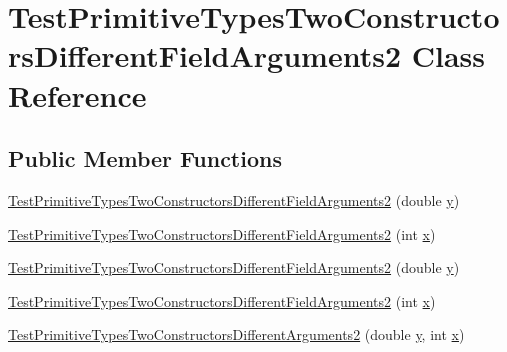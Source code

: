 \hypertarget{classTestPrimitiveTypesTwoConstructorsDifferentFieldArguments2}{
\section{TestPrimitiveTypesTwoConstructorsDifferentFieldArguments2 Class Reference}
\label{classTestPrimitiveTypesTwoConstructorsDifferentFieldArguments2}
}
\subsection*{Public Member Functions}
\begin{DoxyCompactItemize}
\item 
\hyperlink{classTestPrimitiveTypesTwoConstructorsDifferentFieldArguments2_a0d692176317889c0bd07408db128cf9e}{TestPrimitiveTypesTwoConstructorsDifferentFieldArguments2} (double \hyperlink{classTestPrimitiveTypesTwoConstructorsDifferentFieldArguments2_a1022b1a98ab1e4b04e7a1647d4f4f542}{y})
\item 
\hyperlink{classTestPrimitiveTypesTwoConstructorsDifferentFieldArguments2_a18282a52055356278816e6202aaac609}{TestPrimitiveTypesTwoConstructorsDifferentFieldArguments2} (int \hyperlink{classTestPrimitiveTypesTwoConstructorsDifferentFieldArguments2_ae9b62cc07987a2b7d2ad99d31b53e3e2}{x})
\item 
\hyperlink{classTestPrimitiveTypesTwoConstructorsDifferentFieldArguments2_a0d692176317889c0bd07408db128cf9e}{TestPrimitiveTypesTwoConstructorsDifferentFieldArguments2} (double \hyperlink{classTestPrimitiveTypesTwoConstructorsDifferentFieldArguments2_a1022b1a98ab1e4b04e7a1647d4f4f542}{y})
\item 
\hyperlink{classTestPrimitiveTypesTwoConstructorsDifferentFieldArguments2_a18282a52055356278816e6202aaac609}{TestPrimitiveTypesTwoConstructorsDifferentFieldArguments2} (int \hyperlink{classTestPrimitiveTypesTwoConstructorsDifferentFieldArguments2_ae9b62cc07987a2b7d2ad99d31b53e3e2}{x})
\item 
\hyperlink{classTestPrimitiveTypesTwoConstructorsDifferentFieldArguments2_a14daebfb504e73806a5e102bc51fda93}{TestPrimitiveTypesTwoConstructorsDifferentArguments2} (double \hyperlink{classTestPrimitiveTypesTwoConstructorsDifferentFieldArguments2_a1022b1a98ab1e4b04e7a1647d4f4f542}{y}, int \hyperlink{classTestPrimitiveTypesTwoConstructorsDifferentFieldArguments2_ae9b62cc07987a2b7d2ad99d31b53e3e2}{x})
\end{DoxyCompactItemize}
